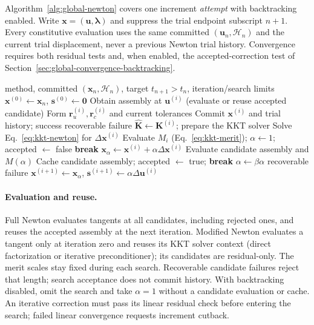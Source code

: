 \documentclass[11pt,a4paper]{article}
\newcommand{\vct}[1]{\mathbf{#1}}
\begin{document}
Algorithm~\ref{alg:global-newton} covers one increment \emph{attempt} with backtracking enabled. Write $\vct x=(\vct u,\vct\lambda)$ and suppress the trial endpoint subscript $n+1$. Every constitutive evaluation uses the same committed $(\vct u_n,\mathcal H_n)$ and the current trial displacement, never a previous Newton trial history. Convergence requires both residual tests and, when enabled, the accepted-correction test of Section~\ref{sec:global-convergence-backtracking}.

\begin{algorithm}[H]
\caption{Full or modified Newton with bounded backtracking: one increment attempt}
\label{alg:global-newton}
\small
\begin{algorithmic}[1]
\Require method, committed $(\vct x_n,\mathcal H_n)$, target $t_{n+1}>t_n$, iteration/search limits
\State $\vct x^{(0)}\gets\vct x_n$, $\vct s^{(0)}\gets\vct0$
    \State Obtain assembly at $\vct u^{(i)}$ (evaluate or reuse accepted candidate)
    \State Form $\vct r_u^{(i)},\vct r_c^{(i)}$ and current tolerances
        \State Commit $\vct x^{(i)}$ and trial history; \Return success
    \EndIf
        \State \Return recoverable failure
    \EndIf
        \State $\widehat{\vct K}\gets\vct K^{(i)}$; prepare the KKT solver
    \EndIf
    \State Solve Eq.~\eqref{eq:kkt-newton} for $\Delta\vct x^{(i)}$
    \State Evaluate $M_i$ (Eq.~\eqref{eq:kkt-merit}); $\alpha\gets1$; accepted $\gets$ false
        \If{$\alpha<\alpha_{\min}$}
            \State \textbf{break}
        \EndIf
        \State $\vct x_\alpha\gets\vct x^{(i)}+\alpha\Delta\vct x^{(i)}$
        \State Evaluate candidate assembly and $M(\alpha)$
            \State Cache candidate assembly; accepted $\gets$ true; \textbf{break}
        \EndIf
        \State $\alpha\gets\beta\alpha$
    \EndFor
        \State \Return recoverable failure
    \EndIf
    \State $\vct x^{(i+1)}\gets\vct x_\alpha$, $\vct s^{(i+1)}\gets\alpha\Delta\vct u^{(i)}$
\EndFor
\end{algorithmic}
\end{algorithm}

\paragraph*{Evaluation and reuse.}
Full Newton evaluates tangents at all candidates, including rejected ones, and reuses the accepted assembly at the next iteration. Modified Newton evaluates a tangent only at iteration zero and reuses its KKT solver context (direct factorization or iterative preconditioner); its candidates are residual-only. The merit scales stay fixed during each search. Recoverable candidate failures reject that length; search acceptance does not commit history. With backtracking disabled, omit the search and take $\alpha=1$ without a candidate evaluation or cache. An iterative correction must pass its linear residual check before entering the search; failed linear convergence requests increment cutback.
\end{document}
